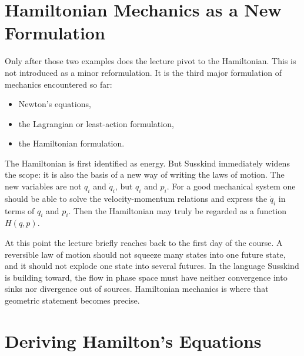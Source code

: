 \section{Hamiltonian Mechanics as a New Formulation}

Only after those two examples does the lecture pivot to the Hamiltonian. This is not introduced as a minor reformulation. It is the third major formulation of mechanics encountered so far:
\begin{itemize}
\item Newton's equations,
\item the Lagrangian or least-action formulation,
\item the Hamiltonian formulation.
\end{itemize}

The Hamiltonian is first identified as energy. But Susskind immediately widens the scope: it is also the basis of a new way of writing the laws of motion. The new variables are not \(q_i\) and \(\dot q_i\), but \(q_i\) and \(p_i\). For a good mechanical system one should be able to solve the velocity-momentum relations and express the \(\dot q_i\) in terms of \(q_i\) and \(p_i\). Then the Hamiltonian may truly be regarded as a function \(H(q,p)\).

At this point the lecture briefly reaches back to the first day of the course. A reversible law of motion should not squeeze many states into one future state, and it should not explode one state into several futures. In the language Susskind is building toward, the flow in phase space must have neither convergence into sinks nor divergence out of sources. Hamiltonian mechanics is where that geometric statement becomes precise.

\section{Deriving Hamilton's Equations}

